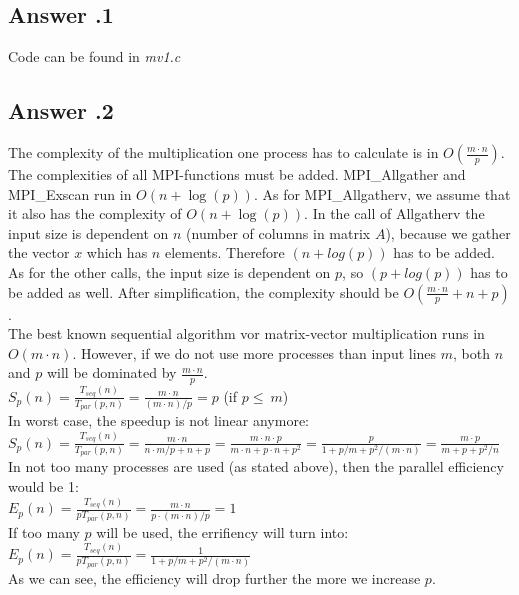 \documentclass[a4paper,%
11pt,%
DIV=12,
headsepline,%
headings=normal,
]{scrartcl}
\newcounter{curex}
\newcommand{\answer}[1]{\subsection*{Answer \arabic{curex}.#1}}
\begin{document}
\answer{1}
Code can be found in \textit{mv1.c}

\answer{2}
The complexity of the multiplication one process has to calculate is in $O(\frac{m \cdot n}{p})$. The complexities of all MPI-functions must be added. MPI\_Allgather and MPI\_Exscan run in $O(n + \log(p))$. As for MPI\_Allgatherv, we assume that it also has the complexity of $O(n + \log(p))$. In the call of Allgatherv the input size is dependent on $n$ (number of columns in matrix $A$), because we gather the vector $x$ which has $n$ elements. Therefore $(n + log(p))$ has to be added. As for the other calls, the input size is dependent on $p$, so $(p + log(p))$ has to be added as well. After simplification, the complexity should be $O\left(\frac{m \cdot n}{p} + n + p\right)$.\\

\noindent The best known sequential algorithm vor matrix-vector multiplication runs in $O(m \cdot n)$. However, if we do not use more processes than input lines $m$, both $n$ and $p$ will be dominated by $\frac{m \cdot n}{p}$.
\\[0.5 em]
$S_{p}(n)=\frac{T_{seq}(n)}{T_{par}(p,n)} = \frac{m \cdot n}{(m \cdot n)/p } = p$ (if $p \leq\ m$)
\\[0.5 em]
In worst case, the speedup is not linear anymore:
\\[0.5 em]
$\displaystyle S_{p}(n)=\frac{T_{seq}(n)}{T_{par}(p,n)} = \frac{m \cdot n}{n \cdot m/p + n + p} = \frac{m \cdot n \cdot p}{m \cdot n + p \cdot  n + p^2} = \frac{p}{1 + p/m + p^2/(m \cdot n)} = \frac{m \cdot p}{m + p + p^2/n}$
\\[0.5 em]
In not too many processes are used (as stated above), then the parallel efficiency would be 1:
\\[0.5 em]
$\displaystyle E_{p}(n)=\frac{T_{seq}(n)}{pT_{par}(p,n)} = \frac{m \cdot n}{p \cdot (m \cdot n)/p} = 1$
\\[0.5 em]
If too many $p$ will be used, the errifiency will turn into:
\\[0.5 em]
$\displaystyle E_{p}(n)=\frac{T_{seq}(n)}{pT_{par}(p,n)} = \frac{1}{1 + p/m + p^2/(m \cdot n)}$
\\[0.5 em]
As we can see, the efficiency will drop further the more we increase $p$.
\end{document}
